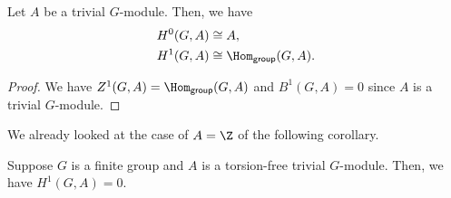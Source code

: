 \begin{corollary}
    Let $A$ be a trivial $G$-module. Then, we have
    \begin{align*}
        H^0(G,A) &\cong A,\\
        H^1(G,A) &\cong \Hom_{\mathsf{group}}(G,A).
    \end{align*}
\end{corollary}
\begin{proof}
    We have $Z^1(G, A) = \Hom_{\mathsf{group}}(G,A)$ and $B^1(G,A) = 0$ since $A$ is a trivial $G$-module.
\end{proof}

We already looked at the case of $A= \Z$ of the following corollary.
\begin{corollary}
    Suppose $G$ is a finite group and $A$ is a torsion-free trivial $G$-module.
    Then, we have $H^1(G,A) = 0$.
\end{corollary}


